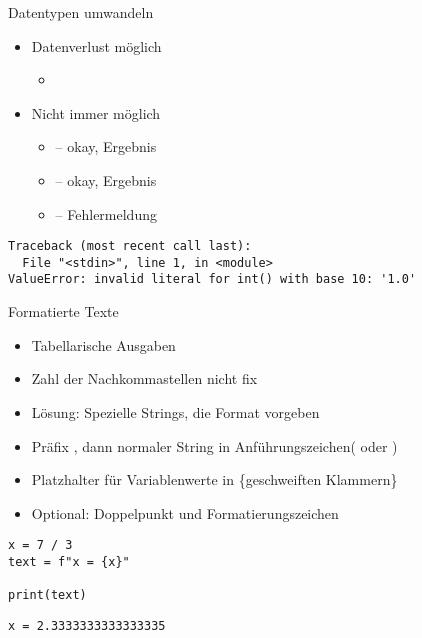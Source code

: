 \begin{frame}[fragile]{Datentypen umwandeln}
%
\begin{itemize}
\item Datenverlust möglich
	\begin{itemize}
	\item {} \thus~ 
	\end{itemize}
\item Nicht immer möglich
	\begin{itemize}
	\item {} -- okay, Ergebnis 
	\item {} -- okay, Ergebnis 
	\item  {} -- Fehlermeldung
	\end{itemize}
\end{itemize}
%
\begin{cmdbox}
\begin{verbatim}
Traceback (most recent call last):
  File "<stdin>", line 1, in <module>
ValueError: invalid literal for int() with base 10: '1.0'
\end{verbatim}
\end{cmdbox}
%
\end{frame}


\begin{frame}[fragile]{Formatierte Texte}
%
\begin{itemize}
\item Tabellarische Ausgaben
\item Zahl der Nachkommastellen nicht fix
\item Lösung: Spezielle Strings, die Format vorgeben
\item Präfix , dann normaler String in Anführungszeichen( oder )
\item Platzhalter für Variablenwerte in \{geschweiften Klammern\}
\item Optional: Doppelpunkt und Formatierungszeichen
\end{itemize}
%
\begin{minipage}[t]{.49\linewidth}
\phantom{x}
\begin{codebox}
\begin{verbatim}
x = 7 / 3
text = f"x = {x}"

print(text)
\end{verbatim}
\end{codebox}
\end{minipage}
%
\begin{minipage}[t]{.49\linewidth}
\phantom{x}
\begin{cmdbox}
\begin{verbatim}
x = 2.3333333333333335
\end{verbatim}
\end{cmdbox}
\end{minipage}
%
\end{frame}

